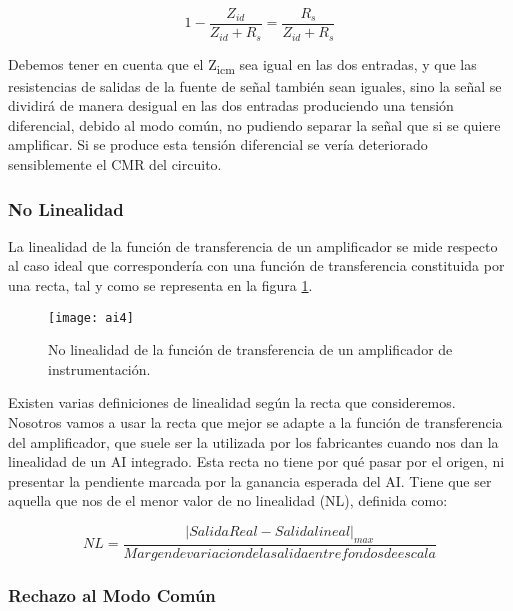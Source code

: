 \begin{equation}\label{eq4}
1 - \frac{Z_{id}}{Z_{id}+R_{s}}= \frac{R_{s}}{Z_{id}+R_{s}}
\end{equation}

Debemos tener en cuenta que el Z\textsubscript{icm} sea igual en las dos entradas, y que las resistencias de salidas de la fuente de señal también sean iguales, sino la señal se dividirá de manera desigual en las dos entradas produciendo una tensión diferencial, debido al modo común, no pudiendo separar la señal que si se quiere amplificar. Si se produce esta tensión diferencial se vería deteriorado sensiblemente el CMR del circuito.


\subsubsection{No Linealidad} %
\label{no_linealidad}

La linealidad de la función de transferencia de un amplificador se mide
respecto al caso ideal que correspondería con una función de transferencia constituida
por una recta, tal y como se representa en la figura \ref{fig:linealidad}.

\begin{figure}[h]
  \centering
  \texttt{[image: ai4]}
  \caption{No linealidad de la función de transferencia de un amplificador de instrumentación.}\label{fig:linealidad}
\end{figure}

Existen varias definiciones de linealidad según la recta que consideremos. Nosotros vamos a usar la recta que mejor se adapte a la función de transferencia del amplificador, que suele ser la utilizada por los fabricantes cuando nos dan la linealidad de un AI integrado. Esta recta no tiene por qué pasar por el origen, ni presentar la pendiente marcada por la ganancia esperada del AI. Tiene que ser aquella que nos de el menor valor de no linealidad (NL), definida como:

\begin{equation}\label{eq4}
NL = \frac{|Salida Real - Salida lineal|_{max}}{Margen de variacion de la salida entre fondos de escala}
\end{equation}


\subsubsection{Rechazo al Modo Común} %
\label{rechazo_CMR}

